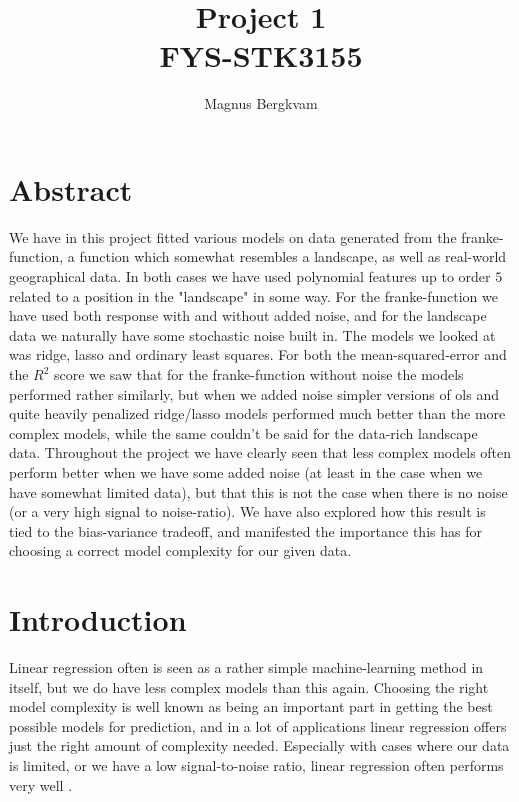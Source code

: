 \documentclass{article}
\author{Magnus Bergkvam}
\title{Project 1 \\ FYS-STK3155}
\begin{document}
\maketitle


\section{Abstract}
We have in this project fitted various models on data generated from the
franke-function, a function which somewhat resembles a landscape, as well as real-world
geographical data. In both cases we have used polynomial features up to order
$5$ related to a position in the "landscape" in some way. For the
franke-function we have used both response with and without added noise, and for
the landscape data we naturally have some stochastic noise built in. The models
we looked at was ridge, lasso and ordinary least squares.  For both the
mean-squared-error and the $R^2$ score we saw that for the franke-function
without noise the models performed rather similarly, but when we added noise
simpler versions of ols and quite heavily penalized ridge/lasso models performed
much better than the more complex models, while the same couldn't be said for
the data-rich landscape data.  Throughout the project we have clearly seen that
less complex models often perform better when we have some added noise (at least
in the case when we have somewhat limited data), but that this is not the case
when there is no noise (or a very high signal to noise-ratio). We have also
explored how this result is tied to the bias-variance tradeoff, and manifested
the importance this has for choosing a correct model complexity for our given
data.

\section{Introduction}
Linear regression often is seen as a rather simple machine-learning method in
itself, but we do have less complex models than this again. Choosing the right
model complexity is well known as being an important part in getting the best
possible models for prediction, and in a lot of applications linear regression
offers just the right amount of complexity needed. Especially with cases where
our data is limited, or we have a low signal-to-noise ratio, linear regression
often performs very well \cite[p.~43]{hastie2009elements}. \\
\end{document}
